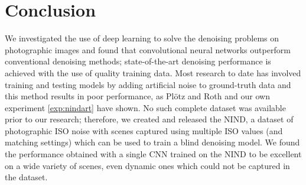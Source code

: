 \chapter{Conclusion}

We investigated the use of deep learning to solve the denoising problems on photographic images and found that convolutional neural networks outperform conventional denoising methods; state-of-the-art denoising performance is achieved with the use of quality training data. Most research to date has involved training and testing models by adding artificial noise to ground-truth data and this method results in poor performance, as Plötz and Roth \cite{darmstadt} and our own experiment \ref{exp:nindart} have shown. No such complete dataset was available prior to our research; therefore, we created and released the \acf{NIND}, a dataset of photographic ISO noise with scenes captured using multiple ISO values (and matching settings) which can be used to train a blind denoising model. We found the performance obtained with a single \acl{CNN} trained on the \ac{NIND} to be excellent on a wide variety of scenes, even dynamic ones which could not be captured in the dataset.

